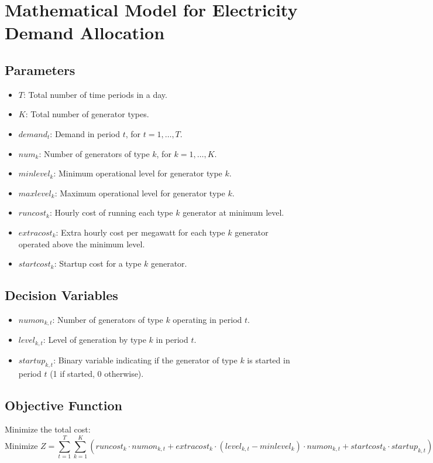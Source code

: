 \documentclass{article}
\begin{document}
\section*{Mathematical Model for Electricity Demand Allocation}

\subsection*{Parameters}
\begin{itemize}
    \item $T$: Total number of time periods in a day.
    \item $K$: Total number of generator types.
    \item $demand_t$: Demand in period $t$, for $t = 1, \ldots, T$.
    \item $num_k$: Number of generators of type $k$, for $k = 1, \ldots, K$.
    \item $minlevel_k$: Minimum operational level for generator type $k$.
    \item $maxlevel_k$: Maximum operational level for generator type $k$.
    \item $runcost_k$: Hourly cost of running each type $k$ generator at minimum level.
    \item $extracost_k$: Extra hourly cost per megawatt for each type $k$ generator operated above the minimum level.
    \item $startcost_k$: Startup cost for a type $k$ generator.
\end{itemize}

\subsection*{Decision Variables}
\begin{itemize}
    \item $numon_{k,t}$: Number of generators of type $k$ operating in period $t$.
    \item $level_{k,t}$: Level of generation by type $k$ in period $t$.
    \item $startup_{k,t}$: Binary variable indicating if the generator of type $k$ is started in period $t$ (1 if started, 0 otherwise).
\end{itemize}

\subsection*{Objective Function}
Minimize the total cost:
\[
\text{Minimize } Z = \sum_{t=1}^{T} \sum_{k=1}^{K} \left( runcost_k \cdot numon_{k,t} + extracost_k \cdot (level_{k,t} - minlevel_k) \cdot numon_{k,t} + startcost_k \cdot startup_{k,t} \right)
\]
\end{document}
